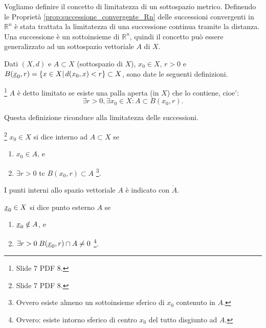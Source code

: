 Vogliamo definire il concetto di limitatezza di un sottospazio metrico. Definendo le Proprietà \ref{prop:successione_convergente_Rn} delle successioni convergenti in $\mathbb R^n$ è stata trattata la limitatezza di una successione continua tramite la distanza. Una successione è un sottoinsieme di $\mathbb R^n$, quindi il concetto può essere generalizzato ad un sottospazio vettoriale $A$ di $X$.

Dati $(X,d)$ e $A\subset X$ (sottospazio di $X$), $x_0\in X,\, r>0$ e $B(\uline x_0, r)=\{x\in X|\, d(x_0,x)<r\}\subset X$, sono date le seguenti definizioni.

\begin{definition} \footnote{Slide 7 PDF 8.}
    $A$ è detto limitato se esiste una palla aperta (in $X$) che lo contiene, cioe':
    \begin{equation*}
        \exists r>0,\exists x_0\in X\colon A\subset B(x_0,r).
    \end{equation*}
\end{definition}

Questa definizione riconduce alla limitatezza delle successioni.

\begin{definition}\footnote{Slide 7 PDF 8.}
    $x_0\in X$ si dice interno ad $A\subset X$ se
    \begin{enumerate}
        \item $x_0\in A$, e
        \item $\exists r>0$ tc $B(x_0, r)\subset A$ \footnote{Ovvero esiste almeno un sottoinsieme sferico di $x_0$ contenuto in $A$.}.
    \end{enumerate}
\end{definition}

\begin{definition}
    I punti interni allo spazio vettoriale $A$ è indicato con $\mathring A$.
\end{definition}

\begin{definition}
    $\uline x_0\in X$ si dice punto esterno $A$ se
    \begin{enumerate}
        \item $\uline x_0\notin A$, e
        \item $\exists r>0\; B(\uline x_0, r)\cap A\neq 0$ \footnote{Ovvero: esiste intorno sferico di centro $x_0$ del tutto disgiunto ad $A$.}.
    \end{enumerate}
\end{definition}

